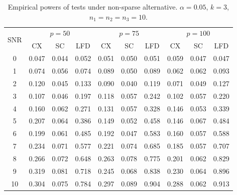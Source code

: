 \documentclass[12pt]{article} %
\DeclareMathOperator{\mytr}{tr}
\newcommand{\bC}{\mathbf{C}}
\newcommand{\bfsym}[1]{\ensuremath{\boldsymbol{#1}}}
\def\bSigma {\bfsym {\Sigma}}
\def\bTheta {\bfsym {\Theta}}
\theoremstyle{definition}
\begin{document}


\begin{table}[!hbp]
    \caption{Empirical powers of tests under non-sparse alternative. $\alpha=0.05$, $k=3$, $n_1=n_2=n_3=10$. }
    \label{table1}
    \centering
    \begin{tabular}{*{10}{c}}
    \toprule
    \multirow{2}{*}{SNR} &\multicolumn{3}{c}{$p=50$}&\multicolumn{3}{c}{$p=75$}&\multicolumn{3}{c}{$p=100$} \\
        \cmidrule(r){2-4}\cmidrule(r){5-7}\cmidrule(r){8-10}
        & CX & SC & LFD & CX &SC &LFD &CX & SC & LFD\\
    \midrule
0 & 0.047 & 0.044 & 0.052 & 0.051 & 0.050 & 0.051 & 0.059 & 0.047 & 0.047 \\ 
1 & 0.074 & 0.056 & 0.074 & 0.089 & 0.050 & 0.089 & 0.062 & 0.062 & 0.093 \\ 
2 & 0.120 & 0.045 & 0.133 & 0.090 & 0.040 & 0.119 & 0.071 & 0.049 & 0.127 \\ 
3 & 0.107 & 0.046 & 0.197 & 0.118 & 0.057 & 0.242 & 0.102 & 0.057 & 0.220 \\ 
4 & 0.160 & 0.062 & 0.271 & 0.131 & 0.057 & 0.328 & 0.146 & 0.053 & 0.339 \\ 
5 & 0.207 & 0.064 & 0.386 & 0.149 & 0.052 & 0.458 & 0.146 & 0.067 & 0.484 \\ 
6 & 0.199 & 0.061 & 0.485 & 0.192 & 0.047 & 0.583 & 0.160 & 0.057 & 0.588 \\ 
7 & 0.234 & 0.071 & 0.577 & 0.221 & 0.074 & 0.685 & 0.185 & 0.057 & 0.707 \\ 
8 & 0.266 & 0.072 & 0.648 & 0.263 & 0.078 & 0.775 & 0.201 & 0.062 & 0.829 \\ 
9 & 0.319 & 0.081 & 0.718 & 0.245 & 0.068 & 0.838 & 0.230 & 0.064 & 0.896 \\ 
10 & 0.304 & 0.075 & 0.784 & 0.297 & 0.089 & 0.904 & 0.288 & 0.062 & 0.913 \\ 
\bottomrule
\end{tabular}
\end{table}
\end{document}
